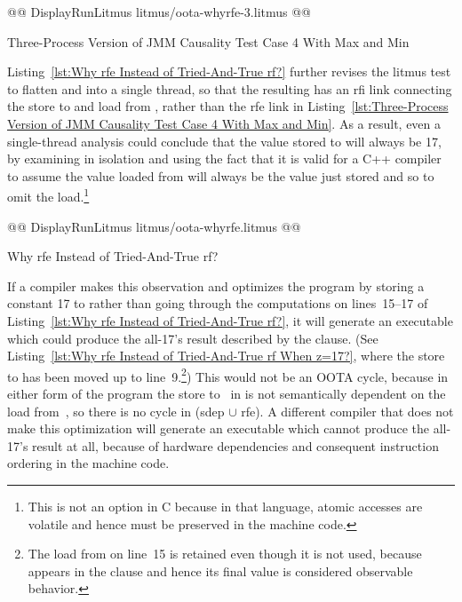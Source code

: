 \documentclass[10]{article}
\begin{document}
\begin{listing}[tbp]
@@ DisplayRunLitmus litmus/oota-whyrfe-3.litmus @@
\caption{Three-Process Version of JMM Causality Test Case 4 With Max and Min}
\label{lst:Three-Process Version of JMM Causality Test Case 4 With Max and Min}
\end{listing}

Listing~\ref{lst:Why rfe Instead of Tried-And-True rf?}
further revises the litmus test
to flatten  and  into a single thread, so that the
resulting  has an rfi link connecting
the store to and load from , rather than the rfe link in
Listing~\ref{lst:Three-Process Version of JMM Causality Test Case 4 With Max and Min}.
As a result, even a single-thread analysis could conclude that the value
stored to  will always be 17, by examining  in isolation and
using the fact that it is valid for a C++ compiler to assume the value
loaded from  will always be the value just stored and so to omit
the load.\footnote{
	This is not an option in C because in that language,
	atomic accesses are volatile and hence must be preserved
	in the machine code.}

\begin{listing}[tbp]
@@ DisplayRunLitmus litmus/oota-whyrfe.litmus @@
\caption{Why rfe Instead of Tried-And-True rf?}
\label{lst:Why rfe Instead of Tried-And-True rf?}
\end{listing}

If a compiler makes this observation and optimizes the program by
storing a constant 17 to  rather than going through the
computations on lines~15--17 of
Listing~\ref{lst:Why rfe Instead of Tried-And-True rf?},
it will generate an executable which could produce the all-17's result
described by the  clause.
(See Listing~\ref{lst:Why rfe Instead of Tried-And-True rf When z=17?},
where the store to  has been moved up to line~9.\footnote{
	The load from  on line~15 is retained even though it is
	not used, because  appears in the  clause and
	hence its final value is considered observable behavior.})
This would not be an OOTA cycle, because in either form of the program
the store to~ in  is not semantically dependent on the
load from~, so there is no cycle in (sdep $\cup$ rfe).
A different compiler that does not make this optimization will
generate an executable which cannot produce the all-17's result at all,
because of hardware dependencies and consequent instruction ordering
in the machine code.
\end{document}
